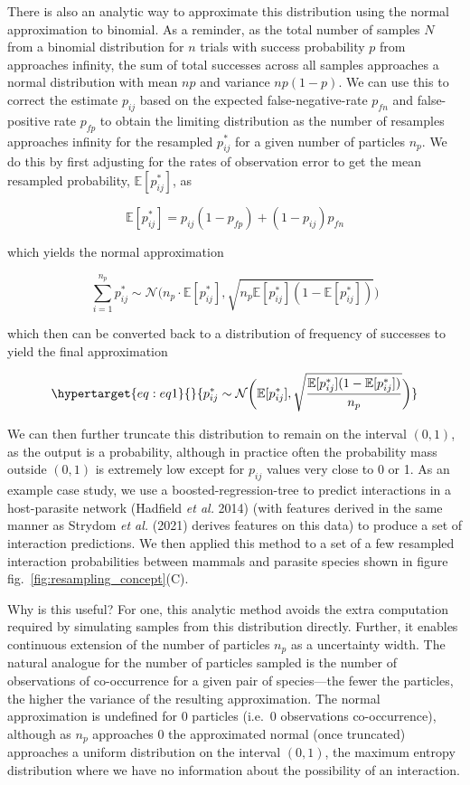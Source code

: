 \documentclass[11pt]{article}
\begin{document}
There is also an analytic way to approximate this distribution using the
normal approximation to binomial. As a reminder, as the total number of
samples \(N\) from a binomial distribution for \(n\) trials with success
probability \(p\) from approaches infinity, the sum of total successes
across all samples approaches a normal distribution with mean \(np\) and
variance \(np(1-p)\). We can use this to correct the estimate \(p_{ij}\)
based on the expected false-negative-rate \(p_{fn}\) and false-positive
rate \(p_{fp}\) to obtain the limiting distribution as the number of
resamples approaches infinity for the resampled \(p_{ij}^*\) for a given
number of particles \(n_p\). We do this by first adjusting for the rates
of observation error to get the mean resampled probability,
\(\mathbb{E}[{p_{ij}^*}]\), as

\[
\mathbb{E}[{p_{ij}^*}] = p_{ij}(1-p_{fp})+ (1-p_{ij})p_{fn}
\]

which yields the normal approximation

\[
\sum_{i=1}^{n_p} p_{ij}^* \sim \mathcal{N}\bigg(n_p \cdot \mathbb{E}[p_{ij}^*], \sqrt{n_p\mathbb{E}[p_{ij}^*] (1- \mathbb{E}[p_{ij}^*])}\bigg)
\]

which then can be converted back to a distribution of frequency of
successes to yield the final approximation

\begin{equation}\protect\hypertarget{eq:eq1}{}{p_{ij}^* \sim \mathcal{N}\bigg( \mathbb{E}[p_{ij}^*] , \sqrt{\frac{\mathbb{E}[p_{ij}^*]
(1-\mathbb{E}[p_{ij}^*] )}{n_p}} \bigg)}\label{eq:eq1}\end{equation}

We can then further truncate this distribution to remain on the interval
\((0,1)\), as the output is a probability, although in practice often
the probability mass outside \((0,1)\) is extremely low except for
\(p_{ij}\) values very close to 0 or 1. As an example case study, we use
a boosted-regression-tree to predict interactions in a host-parasite
network (Hadfield \emph{et al.} 2014) (with features derived in the same
manner as Strydom \emph{et al.} (2021) derives features on this data) to
produce a set of interaction predictions. We then applied this method to
a set of a few resampled interaction probabilities between mammals and
parasite species shown in figure fig.~\ref{fig:resampling_concept}(C).

Why is this useful? For one, this analytic method avoids the extra
computation required by simulating samples from this distribution
directly. Further, it enables continuous extension of the number of
particles \(n_p\) as a uncertainty width. The natural analogue for the
number of particles sampled is the number of observations of
co-occurrence for a given pair of species---the fewer the particles, the
higher the variance of the resulting approximation. The normal
approximation is undefined for 0 particles (i.e.~0 observations
co-occurrence), although as \(n_p\) approaches 0 the approximated normal
(once truncated) approaches a uniform distribution on the interval
\((0,1)\), the maximum entropy distribution where we have no information
about the possibility of an interaction.
\end{document}
